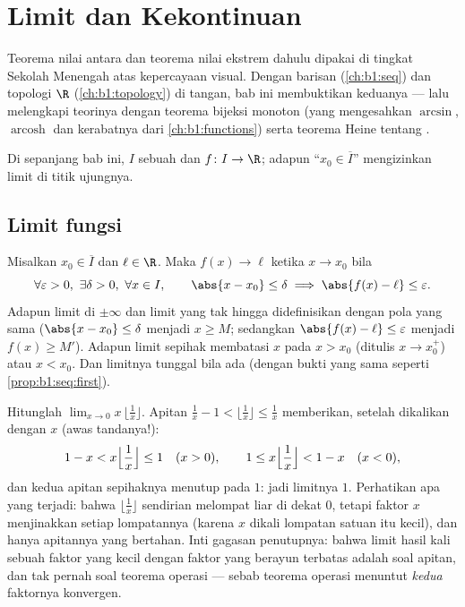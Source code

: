 \chapter{Limit dan Kekontinuan}\label{ch:b1:continuity}

Teorema nilai antara dan teorema nilai ekstrem dahulu
dipakai di tingkat Sekolah Menengah atas kepercayaan visual. Dengan barisan
(\cref{ch:b1:seq}) dan topologi $\R$ (\cref{ch:b1:topology})
di tangan, bab ini membuktikan keduanya --- lalu melengkapi teorinya dengan
teorema bijeksi monoton (yang mengesahkan $\arcsin$,
$\operatorname{arcosh}$ dan kerabatnya dari \cref{ch:b1:functions})
serta teorema Heine tentang .

Di sepanjang bab ini, $I$ sebuah  dan $f \colon I \to \R$; adapun ``$x_0 \in
\overline I$'' mengizinkan limit di titik ujungnya.

\section{Limit fungsi}

\begin{definition}\label{def:b1:continuity:limit}
Misalkan $x_0 \in \overline{I}$ dan $\ell \in \R$. Maka $f(x) \to \ell$ ketika
$x \to x_0$ bila
\[
\forall \varepsilon > 0,\ \exists \delta > 0,\ \forall x \in I,
\qquad \abs{x - x_0} \leq \delta \implies \abs{f(x) - \ell} \leq
\varepsilon .
\]
Adapun limit di $\pm\infty$ dan limit yang tak hingga didefinisikan dengan pola yang
sama ($\abs{x - x_0} \leq \delta$ menjadi $x \geq M$; sedangkan $\abs{f(x) -
\ell} \leq \varepsilon$ menjadi $f(x) \geq M'$). Adapun limit sepihak
membatasi $x$ pada $x > x_0$ (ditulis $x \to x_0^+$) atau $x < x_0$. Dan
limitnya tunggal bila ada (dengan bukti yang sama seperti
\cref{prop:b1:seq:first}).
\end{definition}

\begin{example}\label{ex:b1:continuity:floorlimit}
Hitunglah $\lim_{x \to 0} x\,\bigl\lfloor \frac1x \bigr\rfloor$.
Apitan  $\frac1x - 1 < \lfloor \frac1x \rfloor \leq
\frac1x$ memberikan, setelah dikalikan dengan $x$ (awas tandanya!):
\[
1 - x < x\Bigl\lfloor \frac1x \Bigr\rfloor \leq 1 \quad (x > 0),
\qquad
1 \leq x\Bigl\lfloor \frac1x \Bigr\rfloor < 1 - x \quad (x < 0),
\]
dan kedua apitan sepihaknya menutup pada $1$: jadi limitnya $1$. Perhatikan
apa yang terjadi: bahwa $\lfloor \frac1x\rfloor$ sendirian melompat liar di dekat
$0$, tetapi faktor $x$ menjinakkan setiap lompatannya (karena $x$ dikali lompatan satuan itu
kecil), dan hanya apitannya yang bertahan. Inti gagasan penutupnya: bahwa
limit hasil kali sebuah faktor yang kecil dengan faktor yang berayun terbatas
adalah soal apitan, dan tak pernah soal teorema operasi ---
sebab teorema operasi menuntut \emph{kedua} faktornya konvergen.
\end{example}

